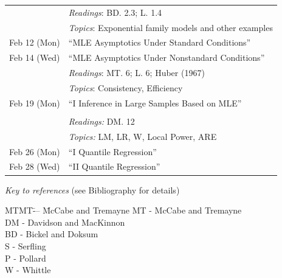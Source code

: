 \begin{tabular}{ll}
& {\it Readings}: BD. 2.3; L. 1.4\\
& {\it Topics}:  Exponential family models and other examples\\
Feb 12 (Mon) & ``MLE Asymptotics Under Standard Conditions''\\
Feb 14 (Wed) & ``MLE Asymptotics Under Nonstandard Conditions''\\
& {\it Readings}: MT. 6; L. 6; Huber (1967)\\
& {\it Topics}:  Consistency, Efficiency\\
Feb 19 (Mon) & ``I Inference in Large Samples Based on MLE'' \\
&\\
& {\it Readings:} DM. 12\\
& {\it Topics:} LM, LR, W, Local Power, ARE\\
Feb 26 (Mon) & ``I Quantile Regression''\\
Feb 28 (Wed) & ``II Quantile Regression''\\
\end{tabular}


\newpage
\noindent
{\it Key to references} (see Bibliography for details)

\begin{tabbing}
MTMT\= --- \= McCabe and Tremayne\kill
MT \> - \> McCabe and Tremayne \\
DM\>  -\>  Davidson and MacKinnon\\
BD\>  -\>  Bickel and Doksum\\
S\>   -\>  Serfling\\
P\>   -\>  Pollard\\
W \>  -\>  Whittle
\end{tabbing}

